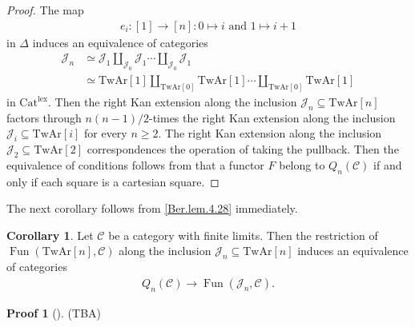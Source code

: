 \documentclass[a4paper,dvipdfmx,11pt,reqno]{amsart}
\DeclareMathOperator{\Fun}{Fun}
\newcommand{\C}{\mathcal{C}}
\newcommand{\J}{\mathcal{J}}
\newcommand{\Catlex}{\mathrm{Cat^{lex}}}
\newcommand{\TwAr}{\mathrm{TwAr}}
\theoremstyle{definition}
\newtheorem{corollary}[theorem]{Corollary}
\newtheorem{newproof}[theorem]{Proof}
\begin{document}
\begin{proof}
  The map 
  \begin{align*}
    e_i : [1] \to [n] : 0 \mapsto i \text{ and } 1 \mapsto i+1
  \end{align*}
  in $\Delta$ induces an equivalence of categories 
  \begin{align*}
    \J_n 
    &\simeq \J_1 \coprod_{\J_0} \J_1 \cdots \coprod_{\J_0} \J_1 \\
    &\simeq \TwAr[1] \coprod_{\TwAr[0]} \TwAr[1] \cdots \coprod_{\TwAr[0]} \TwAr[1]
  \end{align*}
  in $\Catlex$.
  Then the right Kan extension along the inclusion $\J_n \subseteq \TwAr[n]$ factors through $n(n-1)/2$-times the right Kan extension along the inclusion $\J_i \subseteq \TwAr[i]$ for every $n \geq 2$.
  The right Kan extension along the inclusion $\J_2 \subseteq \TwAr[2]$ correspondences the operation of taking the pullback.
  Then the equivalence of conditions follows from that a functor $F$ belong to $Q_n(\C)$ if and only if each square is a cartesian square.
\end{proof}

The next corollary follows from \cref{Ber.lem.4.28} immediately.

\begin{corollary} \label{Ber.cor.4.31}
  Let $\C$ be a category with finite limits.
  Then the restriction of $\Fun(\TwAr[n],\C)$ along the inclusion $\J_n \subseteq \TwAr[n]$ induces an equivalence of categories
  \begin{align*}
    Q_n(\C) \to \Fun(\J_n,\C).
  \end{align*}
\end{corollary}

\begin{newproof}[] \label{proof_of_HLS23.prop.3.2}
  (TBA)
\end{newproof}

\printbibliography
\end{document}
